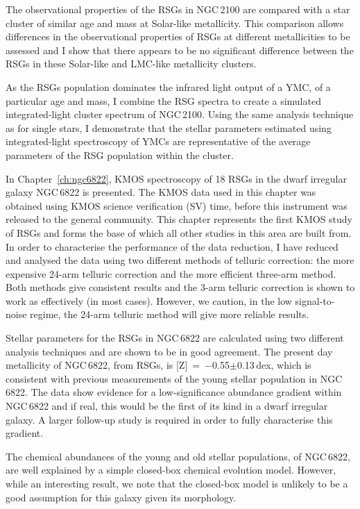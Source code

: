 The observational properties of the RSGs in NGC\,2100 are compared with a star cluster of similar age and mass at Solar-like metallicity.
This comparison allows differences in the observational properties of RSGs at different metallicities to be assessed and I show that there appears to be no significant difference between the RSGs in these Solar-like and LMC-like metallicity clusters.

As the RSGs population dominates the infrared light output of a YMC, of a particular age and mass, I combine the RSG spectra to create a simulated integrated-light cluster spectrum of NGC\,2100.
Using the same analysis technique as for single stars, I demonstrate that the stellar parameters estimated using integrated-light spectroscopy of YMCs are representative of the average parameters of the RSG population within the cluster.

In Chapter~\ref{ch:ngc6822}, KMOS spectroscopy of 18 RSGs in the dwarf irregular galaxy NGC\,6822 is presented.
The KMOS data used in this chapter was obtained using KMOS science verification (SV) time, before this instrument was released to the general community.
This chapter represents the first KMOS study of RSGs and forms the base of which all other studies in this area are built from.
In order to characterise the performance of the data reduction, I have reduced and analysed the data using two different methods of telluric correction: the more expensive 24-arm telluric correction and the more efficient three-arm method.
Both methods give consistent results and the 3-arm telluric correction is shown to work as effectively (in most cases).
However, we caution, in the low signal-to-noise regime, the 24-arm telluric method will give more reliable results.

Stellar parameters for the RSGs in NGC\,6822 are calculated using two different analysis techniques and are shown to be in good agreement.
The present day metallicity of NGC\,6822, from RSGs, is
[Z]~=~$-$0.55$\pm$0.13\,dex, which is consistent with previous measurements of the young stellar population in NGC\,6822.
The data show evidence for a low-significance abundance gradient within NGC\,6822 and if real, this would be the first of its kind in a dwarf irregular galaxy.
A larger follow-up study is required in order to fully characterise this gradient.

The chemical abundances of the young and old stellar populations, of NGC\,6822, are well explained by a simple closed-box chemical evolution model.
However, while an interesting result, we note that the closed-box model is unlikely to be a good assumption for this galaxy given its morphology.

